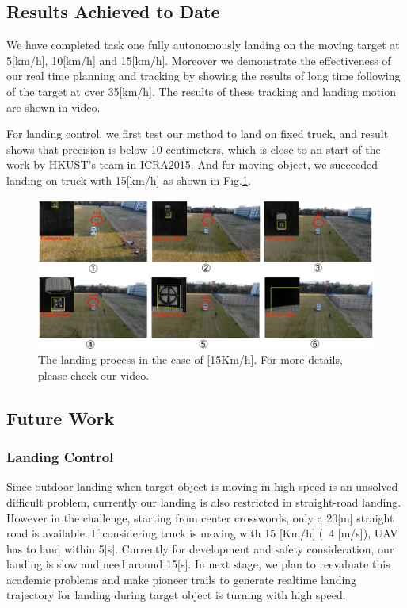 \documentclass{standalone}
\begin{document}
\subsection{Results Achieved to Date}

We have completed task one fully autonomously landing on the moving
target at 5[km/h], 10[km/h] and 15[km/h]. Moreover we demonstrate the effectiveness of our real time planning and tracking by showing the results of long time
following of the target at over 35[km/h]. The results of these tracking and landing motion are shown in video.

For landing control, we first test our method to land on fixed truck, and result shows that precision is below 10 centimeters, which is close to an start-of-the-work by HKUST's team in ICRA2015. And for moving object, we succeeded landing on truck with 15[km/h] as shown in Fig.\ref{figure:landing}.

\begin{figure}[h]
    \begin{center}
      \includegraphics[clip, bb= 0 0 720 315, width=1.0\columnwidth]{sections/task1/images/task1_landing.eps}
    \end{center}
    \caption{The landing process in the case of [15Km/h]. For more details, please check our video.}
    \label{figure:landing}
\end{figure}


\subsection{Future Work}
\subsubsection{Landing Control}
Since outdoor landing when target object is moving in high speed is an unsolved difficult problem, currently our landing is also restricted in straight-road landing. However in the challenge, starting from center crosswords, only a 20[m] straight road is available. If considering truck is moving with 15 [Km/h] (~4 [m/s]), UAV has to land within 5[s]. Currently for development and safety consideration, our landing is slow and need around 15[s].
In next stage, we plan to reevaluate this academic problems and make pioneer trails to generate realtime landing trajectory for landing during target object is turning with high speed.
\end{document}
